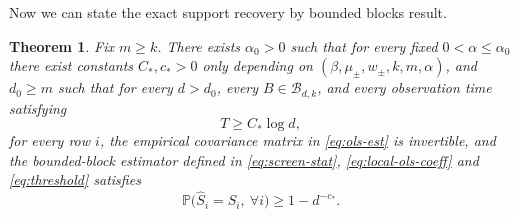 \documentclass{article}
\newtheorem{theorem}{Theorem}[section]
\newcommand{\Pbb}{\mathbb{P}}
\begin{document}
Now we can state the exact support recovery by bounded blocks result.
\begin{theorem}
\label{thm:upper}
Fix $m\ge k$. There exists $\alpha_0>0$ such that for every fixed $0<\alpha\le \alpha_0$ there exist constants $ C_*,c_*>0$ only depending on $(\beta, \mu_\pm, w_\pm, k, m, \alpha)$, and $d_0\geq m$ such that for every $d> d_0$, every $B\in\mathcal B_{d,k}$, and every observation time satisfying
\begin{equation*}
T\ge   C_*\log d,
\end{equation*}
for every row $i$, the empirical covariance matrix in \eqref{eq:ols-est} is invertible, and the bounded-block estimator defined in \eqref{eq:screen-stat}, \eqref{eq:local-ols-coeff} and \eqref{eq:threshold} satisfies
\[
\Pbb\bigl(\widehat S_i=S_i, \ \forall i\bigr)
\ge 1-d^{-c_*}.
\]
\end{theorem}
\end{document}
